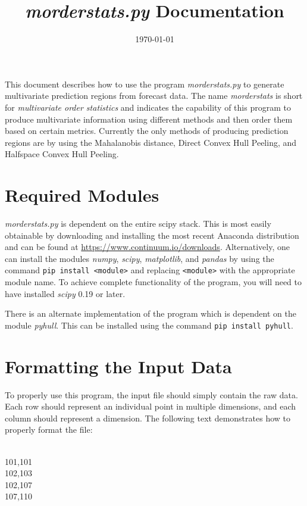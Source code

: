 \documentclass[11pt]{article}
\title{\textit{morderstats.py} Documentation}
\date{\today}
\begin{document}
\maketitle

This document describes how to use the program \textit{morderstats.py} to generate multivariate prediction regions from forecast data. The name \textit{morderstats} is short for \textit{multivariate order statistics} and indicates the capability of this program to produce multivariate information using different methods and then order them based on certain metrics. Currently the only methods of producing prediction regions are by using the Mahalanobis distance, Direct Convex Hull Peeling, and Halfspace Convex Hull Peeling.

\section{Required Modules}

\textit{morderstats.py} is dependent on the entire scipy stack. This is most easily obtainable by downloading and installing the most recent Anaconda distribution and can be found at  \url{https://www.continuum.io/downloads}. Alternatively, one can install the modules \textit{numpy}, \textit{scipy}, \textit{matplotlib}, and \textit{pandas} by using the command \texttt{pip install <module>} and replacing \texttt{<module>} with the appropriate module name. To achieve complete functionality of the program, you will need to have installed \textit{scipy} 0.19 or later.

There is an alternate implementation of the program which is dependent on the module \textit{pyhull}. This can be installed using the command \texttt{pip install pyhull}.

\section{Formatting the Input Data}

To properly use this program, the input file should simply contain the raw data. Each row should represent an individual point in multiple dimensions, and each column should represent a dimension. The following text demonstrates how to properly format the file:

\begin{framed}
	\noindent
\\
101,101\\
102,103\\
102,107\\
107,110\\
\end{framed}
\end{document}
